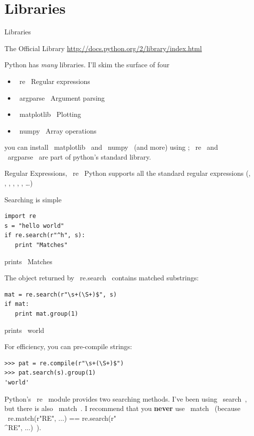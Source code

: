 \documentclass[10pt, t]{beamer}
\let\texttt=\graytt
\let\verb=\codeDelimTwiddles
\let\alert=\textbf
\begin{document}
\section{Libraries}
\label{sec-3}
\begin{frame}[fragile,label=sec-3-1]{Libraries}
 \begin{block}{The Official Library}
\url{http://docs.python.org/2/library/index.html}
\end{block}

Python has \emph{many} libraries.  I'll skim the surface of four
\pause
\begin{itemize}
\item \verb~re~ Regular expressions
\item \verb~argparse~ Argument parsing
\item \verb~matplotlib~ Plotting
\item \verb~numpy~ Array operations
\end{itemize}

you can install \verb~matplotlib~ and \verb~numpy~ (and more) using \texttt{anaconda}; \verb~re~ and \verb~argparse~ are
part of python's standard library.
\end{frame}

\begin{frame}[fragile,label=sec-3-2]{Regular Expressions, \verb~re~}
 Python supports all the standard regular expressions (\code{^}, \code{$}, , \code{[]},
 \code{()}, \code{\\s}, \ldots{})

\pause
Searching is simple
\lstset{language=Python,label= ,caption= ,numbers=none}
\begin{lstlisting}
import re
s = "hello world"
if re.search(r"^h", s):
   print "Matches"
\end{lstlisting}
prints \verb~Matches~
\pause

The object returned by \verb~re.search~ contains matched substrings:
\lstset{language=Python,label= ,caption= ,numbers=none}
\begin{lstlisting}
mat = re.search(r"\s+(\S+)$", s)
if mat:
   print mat.group(1)
\end{lstlisting}
prints \verb~world~

\pause
For efficiency, you can pre-compile strings:
\lstset{language=Python,label= ,caption= ,numbers=none}
\begin{lstlisting}
>>> pat = re.compile(r"\s+(\S+)$")
>>> pat.search(s).group(1)
'world'
\end{lstlisting}

\pause
Python's \verb~re~ module provides two searching methods. I've been using \verb~search~, but there is also \verb~match~.  I
recommend that you \alert{never} use \verb~match~ (because \verb~re.match(r"RE", ...) == re.search(r"\\^RE", ...)~).
\end{frame}
\end{document}

